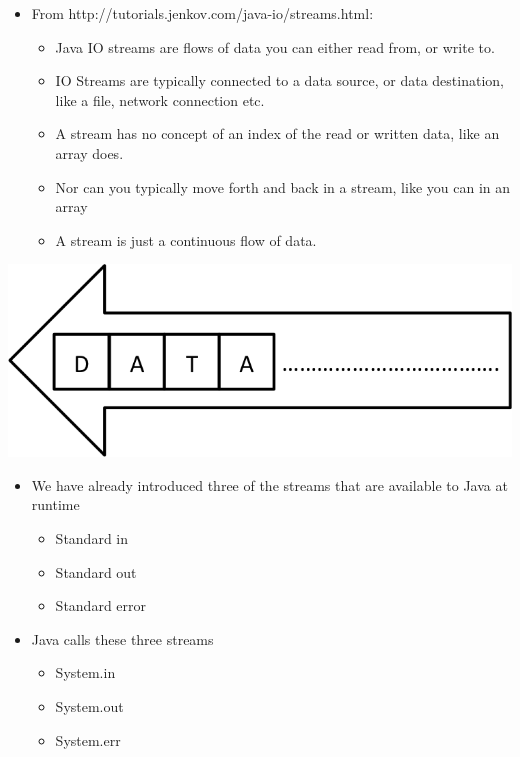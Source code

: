 \documentclass{beamer}
\begin{document}
\begin{frame}

\begin{itemize}
\item From http://tutorials.jenkov.com/java-io/streams.html:

\begin{itemize}
\item Java IO streams are flows of data you can either read from, or write to.
\item IO Streams are typically connected to a data source, or data destination, like a file,
network connection etc.
\item A stream has no concept of an index of the read or written data, like an array does. 
\item Nor can you typically move forth and back in a stream, like you can in an array
\item A stream is just a continuous flow of data.
\end{itemize}
\end{itemize}
\end{frame}

\begin{frame}
\includegraphics[scale=0.5]{Stream1.png}
\end{frame}

\begin{frame}
\begin{itemize}
\item We have already introduced three of the streams that are available to Java at runtime

\begin{itemize}
\item Standard in
\item Standard out
\item Standard error
\end{itemize}
\item Java calls these three streams

\begin{itemize}
\item System.in
\item System.out
\item System.err
\end{itemize}
\end{itemize}

\end{frame}
\end{document}
